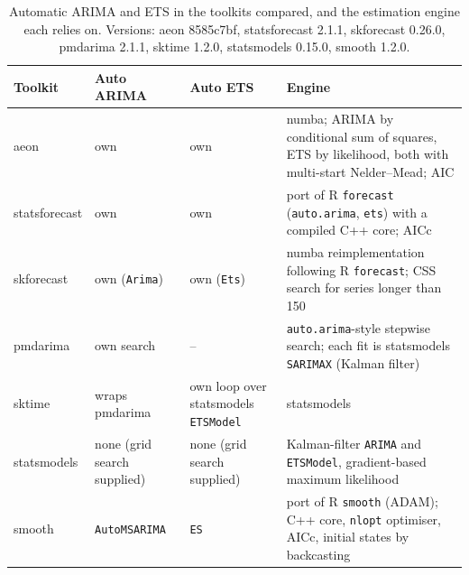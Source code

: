 \documentclass[11pt]{article}
\begin{document}
\begin{table}[ht]
\centering
\small
\caption{Automatic ARIMA and ETS in the toolkits compared, and the estimation
engine each relies on. Versions: aeon 8585c7bf, statsforecast 2.1.1,
skforecast 0.26.0, pmdarima 2.1.1, sktime 1.2.0, statsmodels 0.15.0,
smooth 1.2.0.}
\label{tab:toolkits}
\begin{tabularx}{\textwidth}{@{}l>{\raggedright\arraybackslash}p{2.6cm}>{\raggedright\arraybackslash}p{2.6cm}>{\raggedright\arraybackslash}X@{}}
\toprule
Toolkit & Auto ARIMA & Auto ETS & Engine \\
\midrule
aeon & own & own &
  numba; ARIMA by conditional sum of squares, ETS by likelihood, both with
  multi-start Nelder--Mead; AIC \\
statsforecast & own & own &
  port of R \texttt{forecast} (\texttt{auto.arima}, \texttt{ets}) with a
  compiled C++ core; AICc \\
skforecast & own (\texttt{Arima}) & own (\texttt{Ets}) &
  numba reimplementation following R \texttt{forecast}; CSS search for
  series longer than 150 \\
pmdarima & own search & -- &
  \texttt{auto.arima}-style stepwise search; each fit is statsmodels
  \texttt{SARIMAX} (Kalman filter) \\
sktime & wraps pmdarima & own loop over statsmodels \texttt{ETSModel} &
  statsmodels \\
statsmodels & none (grid search supplied) & none (grid search supplied) &
  Kalman-filter \texttt{ARIMA} and \texttt{ETSModel}, gradient-based maximum
  likelihood \\
smooth & \texttt{AutoMSARIMA} & \texttt{ES} &
  port of R \texttt{smooth} (ADAM); C++ core, \texttt{nlopt} optimiser,
  AICc, initial states by backcasting \\
\bottomrule
\end{tabularx}
\end{table}
\end{document}
